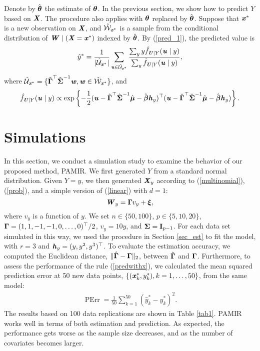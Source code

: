 \documentclass[12pt]{article}
\def \bfith{\mbox{\textbf{\textit{h}}}}
\def \bfitu{\mbox{\textbf{\textit{u}}}}
\def \bfitw{\mbox{\textbf{\textit{w}}}}
\def \bfitx{\mbox{\textbf{\textit{x}}}}
\def \sbfitu{\mbox{\scriptsize\textbf{\textit{u}}}}
\def \sbfitx{\mbox{\scriptsize\textbf{\textit{x}}}}
\def \tbfitx{\mbox{\tiny\textbf{\textit{x}}}}
\def \sbfitU{\mbox{\scriptsize\textbf{\textit{U}}}}
\def \bfitW{\mbox{\textbf{\textit{W}}}}
\def \bfitX{\mbox{\textbf{\textit{X}}}}
\def \bfbeta{\mbox{\boldmath $\beta$}}
\def \bfmu{\mbox{\boldmath $\mu$}}
\def \bftheta{\mbox{\boldmath $\theta$}}
\def \bfxi{\mbox{\boldmath $\xi$}}
\def \I{\mathbf{I}}
\def \bfGamma{\mbox{\boldmath $\Gamma$}}
\def \bfSigma{\mbox{\boldmath $\Sigma$}}
\begin{document}
Denote by $\hat{\bftheta}$ the estimate of ${\bftheta}$. In the previous section, we show how to predict $Y$ based on $\bfitX$. The procedure also applies with $\bftheta$ replaced by $\hat{\bftheta}$. Suppose that $\bfitx^*$ is a new observation on $\bfitX$, and $\hat{\mathcal{W}}_{\sbfitx^*}$ is a sample from the conditional distribution of $\bfitW \mid (\bfitX = \bfitx^*)$ indexed by $\hat{\bftheta}$. By (\ref{pred_1}), the predicted value is
\begin{eqnarray}\label{predwithx}
\hat{y}^* = \frac{1}{|\hat{\mathcal{U}}_{\sbfitx^*}|}\sum_{\sbfitu \in \hat{\mathcal{U}}_{\tbfitx^*}} \frac{\sum_{y} y \hat{f}_{\sbfitU \mid Y}(\bfitu \mid y)}{\sum_y \hat{f}_{\sbfitU \mid Y}(\bfitu \mid y)},
\end{eqnarray}
where $\hat{\mathcal{U}}_{\sbfitx^*} = \{\hat{\bfGamma}^{\top}\hat{\bfSigma}^{-1}\bfitw, \bfitw \in \hat{\mathcal{W}}_{\sbfitx^*}\}$, and
$$\hat{f}_{\sbfitU \mid Y}(\bfitu \mid y) \propto \exp\left\{-\frac{1}{2}(\bfitu - \hat{\bfGamma}^{\top} \hat{\bfSigma}^{-1} \hat{\bfmu} - \hat{\bfbeta} \bfith_y)^{\top} (\bfitu - \hat{\bfGamma}^{\top} \hat{\bfSigma}^{-1} \hat{\bfmu} - \hat{\bfbeta} \bfith_y)\right\}.$$

\section{Simulations}\label{sec_simu}

In this section, we conduct a simulation study to examine the behavior of our proposed method, PAMIR. We first generated $Y$ from a standard normal distribution. Given $Y = y$, we then generated $\bfitX_y$ according to (\ref{multinomial}), (\ref{prob}), and a simple version of (\ref{linear}) with $d = 1$:
$$\bfitW_y = \bfGamma v_y + \bfxi,$$
where $v_y$ is a function of $y$. We set $n \in \{50, 100\}$, $p \in \{5, 10, 20\}$, $\bfGamma = (1, 1, -1, -1, 0, \ldots, 0)^{\top} / 2$, $v_y = 10 y$, and $\bfSigma = \I_{p - 1}$. For each data set simulated in this way, we used the procedure in Section \ref{sec_est} to fit the model, with $r = 3$ and $\bfith_y = (y, y^2, y^3)^{\top}$. To evaluate the estimation accuracy, we computed the Euclidean distance, $\|\hat{\bfGamma} - \bfGamma\|_2$, between $\hat{\bfGamma}$ and $\bfGamma$. Furthermore, to assess the performance of the rule (\ref{predwithx}), we calculated the mean squared prediction error at 50 new data points, $\{(\bfitx_k^*, y_k^*), k = 1, \ldots, 50\}$, from the same model:
\begin{eqnarray}\label{PErr}
\operatorname{PErr} = \frac{1}{50}\sum_{k = 1}^{50} (\hat{y}_k^* - y^*_k)^2.
\end{eqnarray}
The results based on 100 data replications are shown in Table \ref{tab1}. PAMIR works well in terms of both estimation and prediction. As expected, the performance gets worse as the sample size decreases, and as the number of covariates becomes larger.
\end{document}
